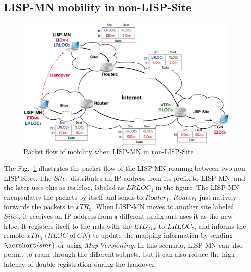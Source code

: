 \subsection{LISP-MN mobility in non-LISP-Site}
\label{subsec:lispMN_NLS}
\begin{figure}[!t]
	\centering
	\includegraphics[width=\textwidth]{Pics/LISP-MN_in_non-LISP-Site.eps}
	\caption{Packet flow of mobility when LISP-MN in non-LISP-Site}
	\label{LISP-MN_in_non-LISP-Site}
\end{figure}
The Fig.~\ref{LISP-MN_in_non-LISP-Site} illustrates the packet flow of the $\text{LISP-MN}$ roaming between two non-LISP-Sites. The $Site_1$ distributes an IP address from its prefix to $\text{LISP-MN}$, and the later uses this as its \acrshort{lrloc}, labeled as $LRLOC_1$ in the figure. The $\text{LISP-MN}$ encapsulates the packets by itself and sends to $Router_1$. $Router_1$ just natively forwards the packets to $xTR_3$. When $\text{LISP-MN}$ moves to another site labeled $Site_2$, it receives an IP address from a different prefix and uses it as the new \acrshort{lrloc}. It registers itself to the \acrshort{mds} with the $EID_{MN}\text{-to-}LRLOC_2$, and informs the remote ${xTR_3}$ ($RLOC$ of $CN$) to update the mapping information by sending $\acrshort{smr}$ or using $Map\textbf{-}Versioning$. In this scenario, $\text{LISP-MN}$ can also permit to roam through the different subnets, but it can also reduce the high latency of double registration during the handover. 


